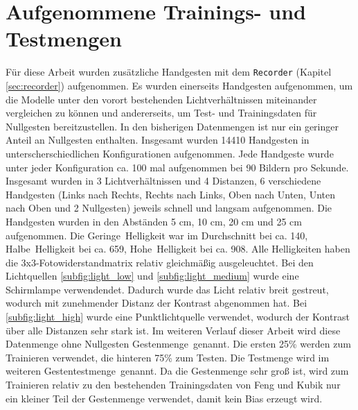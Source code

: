 \section{Aufgenommene Trainings- und Testmengen}
\label{sec:DymelData}
Für diese Arbeit wurden zusätzliche Handgesten mit dem \texttt{Recorder} (Kapitel \ref{sec:recorder}) aufgenommen. Es wurden einerseits Handgesten aufgenommen, um die Modelle unter den
vorort bestehenden Lichtverhältnissen miteinander vergleichen zu können und andererseits, um Test- und Trainingsdaten für Nullgesten bereitzustellen. In den
bisherigen Datenmengen ist nur ein geringer Anteil an Nullgesten enthalten. Insgesamt wurden 14410 Handgesten in unterscherschiedlichen Konfigurationen aufgenommen.
\newline
\newline
Jede Handgeste wurde unter jeder Konfiguration ca. 100 mal aufgenommen bei 90 Bildern pro Sekunde. Insgesamt wurden in 3 Lichtverhältnissen und 4 Distanzen, 6 verschiedene Handgesten (Links nach Rechts,
Rechts nach Links, Oben nach Unten, Unten nach Oben und 2 Nullgesten) jeweils schnell und langsam aufgenommen. Die Handgesten wurden in den Abständen 5 cm, 10 cm, 20 cm und 25 cm aufgenommen.
\newline
\newline
Die \glqq Geringe\grqq\ Helligkeit war im Durchschnitt bei ca. 140, \glqq Halbe\grqq\ Helligkeit bei ca. 659, \glqq Hohe\grqq\ Helligkeit bei ca. 908. Alle Helligkeiten haben die 3x3-Fotowiderstandmatrix
relativ gleichmäßig ausgeleuchtet. Bei den Lichtquellen \ref{subfig:light_low} und \ref{subfig:light_medium} wurde eine Schirmlampe verwendendet. Dadurch wurde das Licht relativ breit gestreut,
wodurch mit zunehmender Distanz der Kontrast abgenommen hat. Bei \ref{subfig:light_high} wurde eine Punktlichtquelle verwendet, wodurch der Kontrast über alle Distanzen sehr stark ist.
Im weiteren Verlauf dieser Arbeit wird diese Datenmenge ohne Nullgesten \glqq Gestenmenge\grqq\ genannt. Die ersten 25\% werden zum Trainieren verwendet, die hinteren 75\% zum Testen. Die Testmenge
wird im weiteren \glqq Gestentestmenge\grqq\ genannt. Da die Gestenmenge sehr groß ist, wird zum Trainieren relativ zu den bestehenden Trainingsdaten von Feng und Kubik nur ein kleiner Teil der Gestenmenge verwendet,
damit kein Bias erzeugt wird.
\newline
\newline
